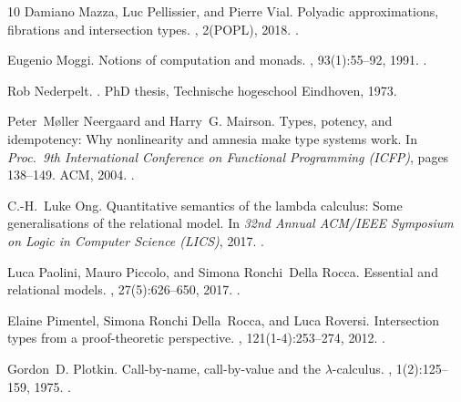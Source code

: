 \documentclass[10pt,a4paper]{amsart}
\begin{document}
\begin{thebibliography}{10}
Damiano Mazza, Luc Pellissier, and Pierre Vial.
\newblock Polyadic approximations, fibrations and intersection types.
, 2(POPL), 2018.
\newblock \href {https://doi.org/10.1145/3158094} {}.

Eugenio Moggi.
\newblock Notions of computation and monads.
, 93(1):55--92, 1991.
\newblock \href {https://doi.org/10.1016/0890-5401(91)90052-4}
  {}.

Rob Nederpelt.
.
\newblock PhD thesis, Technische hogeschool Eindhoven, 1973.

Peter~M{\o}ller Neergaard and Harry~G. Mairson.
\newblock Types, potency, and idempotency: {W}hy nonlinearity and amnesia make
  type systems work.
\newblock In {\em Proc.\ 9th International Conference on Functional Programming
  (ICFP)}, pages 138--149. {ACM}, 2004.
\newblock \href {https://doi.org/10.1145/1016850.1016871}
  {}.

C.-H.~Luke Ong.
\newblock Quantitative semantics of the lambda calculus: {S}ome generalisations
  of the relational model.
\newblock In {\em 32nd Annual ACM/IEEE Symposium on Logic in Computer Science
  (LICS)}, 2017.
\newblock \href {https://doi.org/10.1109/LICS.2017.8005064}
  {}.

Luca Paolini, Mauro Piccolo, and Simona Ronchi~Della Rocca.
\newblock Essential and relational models.
, 27(5):626--650, 2017.
\newblock \href {https://doi.org/10.1017/S0960129515000316}
  {}.

Elaine Pimentel, Simona Ronchi Della~Rocca, and Luca Roversi.
\newblock Intersection types from a proof-theoretic perspective.
, 121(1-4):253--274, 2012.
\newblock \href {https://doi.org/10.3233/FI-2012-778}
  {}.

Gordon~D. Plotkin.
\newblock Call-by-name, call-by-value and the $\lambda$-calculus.
, 1(2):125--159, 1975.
\newblock \href {https://doi.org/10.1016/0304-3975(75)90017-1}
  {}.


\end{thebibliography}
\end{document}
